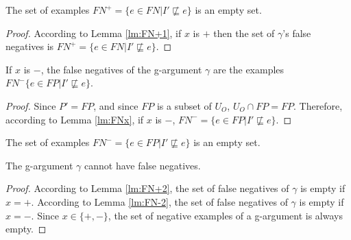 \begin{lemma}\label{lm:FN+2}
The set of examples $FN^{+} = \{ e \in FN | I' \not\sqsubseteq e \}$ is an empty set.
\end{lemma}

\begin{proof}
According to Lemma \ref{lm:FN+1}, if $x$ is $+$ then the set of $\gamma$'s false negatives is $FN^{+} = \{ e \in FN | I' \not\sqsubseteq e \}$.
\end{proof}

\begin{lemma}\label{lm:FN-1}
If $x$ is $-$, the false negatives of the g-argument $\gamma$ are the examples $FN^{-} \{ e \in FP | I' \not\sqsubseteq e \}$.
\end{lemma}

\begin{proof}
Since $P' = FP$, and since $FP$ is a subset of $U_{O}$, $U_{O} \cap FP = FP$. Therefore, according to Lemma \ref{lm:FNx}, if $x$ is $-$, $FN^{-} = \{ e \in FP | I' \not\sqsubseteq e \}$.
\end{proof}

\begin{lemma}\label{lm:FN-2}
The set of examples $FN^{-} = \{ e \in FP | I' \not\sqsubseteq e \}$ is an empty set.
\end{lemma}

\begin{lemma}
The g-argument $\gamma$ cannot have false negatives.
\end{lemma}

\begin{proof}
According to Lemma \ref{lm:FN+2}, the set of false negatives of $\gamma$ is empty if $x = +$. According to Lemma \ref{lm:FN-2}, the set of false negatives of $\gamma$ is empty if $x = -$. Since $x \in \{+,- \}$, the set of negative examples of a g-argument is always empty.
\end{proof}